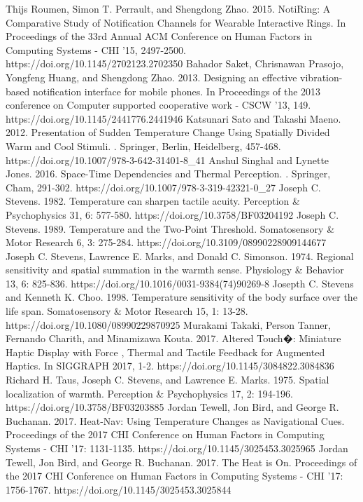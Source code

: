 \documentclass[preprint,12pt]{elsarticle}
\begin{document}
\begin{thebibliography}{00}
Thijs Roumen, Simon T. Perrault, and Shengdong Zhao. 2015. NotiRing: A Comparative Study of Notification Channels for Wearable Interactive Rings. In Proceedings of the 33rd Annual ACM Conference on Human Factors in Computing Systems - CHI '15, 2497-2500. https://doi.org/10.1145/2702123.2702350
Bahador Saket, Chrisnawan Prasojo, Yongfeng Huang, and Shengdong Zhao. 2013. Designing an effective vibration-based notification interface for mobile phones. In Proceedings of the 2013 conference on Computer supported cooperative work - CSCW '13, 149. https://doi.org/10.1145/2441776.2441946
Katsunari Sato and Takashi Maeno. 2012. Presentation of Sudden Temperature Change Using Spatially Divided Warm and Cool Stimuli. . Springer, Berlin, Heidelberg, 457-468. https://doi.org/10.1007/978-3-642-31401-8\_41
Anshul Singhal and Lynette Jones. 2016. Space-Time Dependencies and Thermal Perception. . Springer, Cham, 291-302. https://doi.org/10.1007/978-3-319-42321-0\_27
Joseph C. Stevens. 1982. Temperature can sharpen tactile acuity. Perception \& Psychophysics 31, 6: 577-580. https://doi.org/10.3758/BF03204192
Joseph C. Stevens. 1989. Temperature and the Two-Point Threshold. Somatosensory \& Motor Research 6, 3: 275-284. https://doi.org/10.3109/08990228909144677
Joseph C. Stevens, Lawrence E. Marks, and Donald C. Simonson. 1974. Regional sensitivity and spatial summation in the warmth sense. Physiology \& Behavior 13, 6: 825-836. https://doi.org/10.1016/0031-9384(74)90269-8
Josepth C. Stevens and Kenneth K. Choo. 1998. Temperature sensitivity of the body surface over the life span. Somatosensory \& Motor Research 15, 1: 13-28. https://doi.org/10.1080/08990229870925
Murakami Takaki, Person Tanner, Fernando Charith, and Minamizawa Kouta. 2017. Altered Touch�: Miniature Haptic Display with Force , Thermal and Tactile Feedback for Augmented Haptics. In SIGGRAPH 2017, 1-2. https://doi.org/10.1145/3084822.3084836
Richard H. Taus, Joseph C. Stevens, and Lawrence E. Marks. 1975. Spatial localization of warmth. Perception \& Psychophysics 17, 2: 194-196. https://doi.org/10.3758/BF03203885
Jordan Tewell, Jon Bird, and George R. Buchanan. 2017. Heat-Nav: Using Temperature Changes as Navigational Cues. Proceedings of the 2017 CHI Conference on Human Factors in Computing Systems - CHI '17: 1131-1135. https://doi.org/10.1145/3025453.3025965
Jordan Tewell, Jon Bird, and George R. Buchanan. 2017. The Heat is On. Proceedings of the 2017 CHI Conference on Human Factors in Computing Systems - CHI '17: 1756-1767. https://doi.org/10.1145/3025453.3025844

\end{thebibliography}
\end{document}
